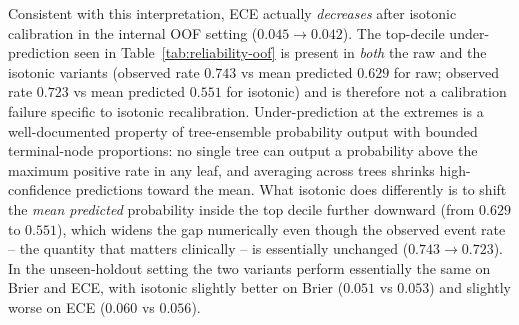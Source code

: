 \documentclass[11pt,a4paper]{article}
\begin{document}
Consistent with this interpretation, ECE actually \emph{decreases} after isotonic calibration in the internal OOF setting ($0.045 \rightarrow 0.042$). The top-decile under-prediction seen in Table~\ref{tab:reliability-oof} is present in \emph{both} the raw and the isotonic variants (observed rate $0.743$ vs mean predicted $0.629$ for raw; observed rate $0.723$ vs mean predicted $0.551$ for isotonic) and is therefore not a calibration failure specific to isotonic recalibration. Under-prediction at the extremes is a well-documented property of tree-ensemble probability output with bounded terminal-node proportions\cite{NiculescuMizil2005}: no single tree can output a probability above the maximum positive rate in any leaf, and averaging across trees shrinks high-confidence predictions toward the mean. What isotonic does differently is to shift the \emph{mean predicted} probability inside the top decile further downward (from $0.629$ to $0.551$), which widens the gap numerically even though the observed event rate -- the quantity that matters clinically -- is essentially unchanged ($0.743 \to 0.723$). In the unseen-holdout setting the two variants perform essentially the same on Brier and ECE, with isotonic slightly better on Brier ($0.051$ vs $0.053$) and slightly worse on ECE ($0.060$ vs $0.056$).
\end{document}
